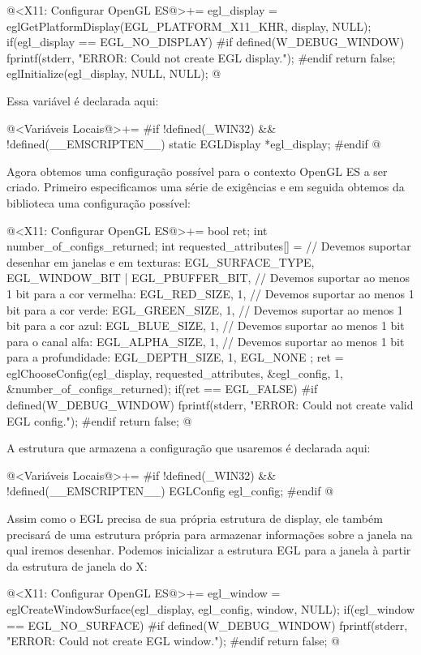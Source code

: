 \iniciocodigo
@<X11: Configurar OpenGL ES@>+=
egl_display = eglGetPlatformDisplay(EGL_PLATFORM_X11_KHR, display,
                                    NULL);
if(egl_display == EGL_NO_DISPLAY){
#if defined(W_DEBUG_WINDOW)
  fprintf(stderr, "ERROR: Could not create EGL display.\n");
#endif
  return false;
}
eglInitialize(egl_display, NULL, NULL);
@
\fimcodigo

Essa variável é declarada aqui:

\iniciocodigo
@<Variáveis Locais@>+=
#if !defined(_WIN32) && !defined(__EMSCRIPTEN__)
static EGLDisplay *egl_display;
#endif
@
\fimcodigo

Agora obtemos uma configuração possível para o contexto OpenGL ES a
ser criado. Primeiro especificamos uma série de exigências e em
seguida obtemos da biblioteca uma configuração possível:

\iniciocodigo
@<X11: Configurar OpenGL ES@>+=
{
  bool ret;
  int number_of_configs_returned;
  int requested_attributes[] = {
    // Devemos suportar desenhar em janelas e em texturas:
    EGL_SURFACE_TYPE,  EGL_WINDOW_BIT | EGL_PBUFFER_BIT,
    // Devemos suportar ao menos 1 bit para a cor vermelha:
    EGL_RED_SIZE, 1,
    // Devemos suportar ao menos 1 bit para a cor verde:
    EGL_GREEN_SIZE, 1,
    // Devemos suportar ao menos 1 bit para a cor azul:
    EGL_BLUE_SIZE, 1,
    // Devemos suportar ao menos 1 bit para o canal alfa:
    EGL_ALPHA_SIZE, 1,
    // Devemos suportar ao menos 1 bit para a profundidade:
    EGL_DEPTH_SIZE, 1,
    EGL_NONE
  };
  ret = eglChooseConfig(egl_display, requested_attributes,
                        &egl_config, 1, &number_of_configs_returned);
  if(ret == EGL_FALSE){
#if defined(W_DEBUG_WINDOW)
    fprintf(stderr, "ERROR: Could not create valid EGL config.\n");
#endif
    return false;
  }
}
@
\fimcodigo

A estrutura que armazena a configuração que usaremos é declarada aqui:

\iniciocodigo
@<Variáveis Locais@>+=
#if !defined(_WIN32) && !defined(__EMSCRIPTEN__)
EGLConfig egl_config;
#endif
@
\fimcodigo


Assim como o EGL precisa de sua própria estrutura de display, ele
também precisará de uma estrutura própria para armazenar informações
sobre a janela na qual iremos desenhar. Podemos inicializar a
estrutura EGL para a janela à partir da estrutura de janela do X:

\iniciocodigo
@<X11: Configurar OpenGL ES@>+=
egl_window = eglCreateWindowSurface(egl_display, egl_config, window,
                                    NULL);
if(egl_window == EGL_NO_SURFACE){
#if defined(W_DEBUG_WINDOW)
  fprintf(stderr, "ERROR: Could not create EGL window.\n");
#endif
  return false;
}
@
\fimcodigo

